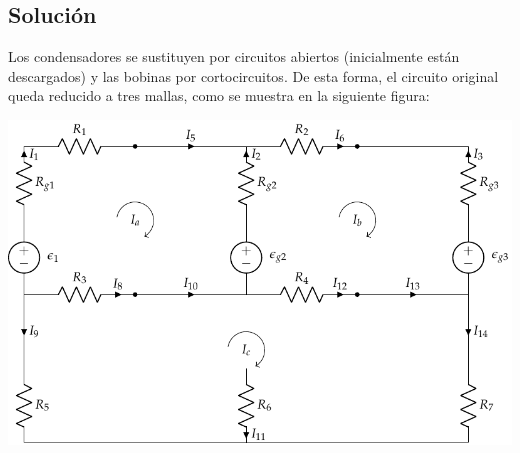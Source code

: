 \subsection*{Solución}
Los condensadores se sustituyen por circuitos abiertos (inicialmente
están descargados) y las bobinas por cortocircuitos. De esta forma, el
circuito original queda reducido a tres mallas, como se muestra en la
siguiente figura:

\begin{center}
  \includegraphics{figuras/mallas_condensadores_bobinas_mod.pdf}
\end{center}


